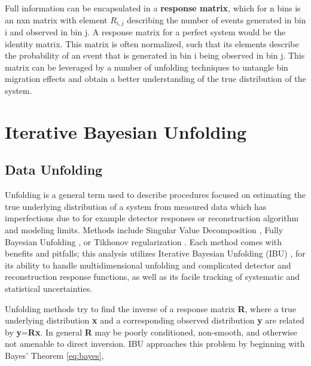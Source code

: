    

    Full information can be encapsulated in a \textbf{response matrix}, which for n bins is an nxn matrix with element $R_{i,j}$ describing the number of events generated in bin i and observed in bin j. A response matrix for a perfect system would be the identity matrix. This matrix is often normalized, such that its elements describe the probability of an event that is generated in bin i being observed in bin j. This matrix can be leveraged by a number of unfolding techniques to untangle bin migration effects and obtain a better understanding of the true distribution of the system. 


 \clearpage

\section{Iterative Bayesian Unfolding}

    \subsection{Data Unfolding}

        Unfolding is a general term used to describe procedures focused on estimating the true underlying distribution of a system from measured data which has imperfections due to for example detector responses or reconstruction algorithm and modeling limits. Methods include Singular Value Decomposition \parencite{Klema1980TheApplications}, Fully Bayesian Unfolding \cite{Choudalakis2012FullyUnfolding}, or Tikhonov regularization \parencite{Hoerl1970RidgeProblems}. Each method comes with benefits and pitfalls; this analysis utilizes Iterative Bayesian Unfolding (IBU) \parencite{DAgostini1995ATheorem}, \parencite{DAgostini2010ImprovedUnfolding} for its ability to handle multidimensional unfolding and complicated detector and reconstruction response functions, as well as its facile tracking of systematic and statistical uncertainties. 

        Unfolding methods try to find the inverse of a response matrix \textbf{R}, where a true underlying distribution \textbf{x} and a corresponding observed distribution \textbf{y} are related by \textbf{y}=\textbf{Rx}. In general \textbf{R} may be poorly conditioned, non-smooth, and otherwise not amenable to direct inversion. IBU approaches this problem by beginning with Bayes' Theorem \eqref{eq:bayes},

